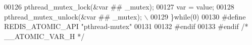 \begin{DoxyCode}
00126     \textcolor{preprocessor}{pthread\_mutex\_lock}\textcolor{preprocessor}{(}\textcolor{preprocessor}{&}\textcolor{preprocessor}{var} \textcolor{preprocessor}{##} \textcolor{preprocessor}{\_mutex}\textcolor{preprocessor}{)}\textcolor{preprocessor}{;}
00127     \textcolor{preprocessor}{var} \textcolor{preprocessor}{=} \textcolor{preprocessor}{value}\textcolor{preprocessor}{;}
00128     \textcolor{preprocessor}{pthread\_mutex\_unlock}\textcolor{preprocessor}{(}\textcolor{preprocessor}{&}\textcolor{preprocessor}{var} \textcolor{preprocessor}{##} \textcolor{preprocessor}{\_mutex}\textcolor{preprocessor}{)}\textcolor{preprocessor}{;} \textcolor{preprocessor}{\(\backslash\)}
00129 \textcolor{preprocessor}{\}}\textcolor{preprocessor}{while}\textcolor{preprocessor}{(}0\textcolor{preprocessor}{)}
00130 \textcolor{preprocessor}{#}\textcolor{preprocessor}{define} \textcolor{preprocessor}{REDIS\_ATOMIC\_API} \textcolor{stringliteral}{"pthread-mutex"}
00131 
00132 \textcolor{preprocessor}{#}\textcolor{preprocessor}{endif}
00133 \textcolor{preprocessor}{#}\textcolor{preprocessor}{endif} \textcolor{comment}{/* \_\_ATOMIC\_VAR\_H */}
\end{DoxyCode}
